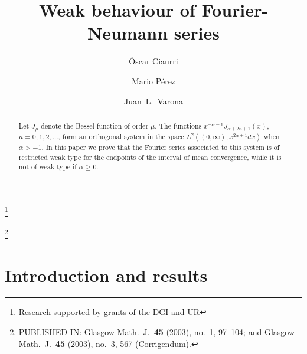 \documentclass{amsart}
\theoremstyle{plain}
\begin{document}
\title{Weak behaviour of Fourier-Neumann series}

\author[\'O. Ciaurri]{\'Oscar Ciaurri}
\address{Departamento de Matem\'aticas y Computaci\'on,
Universidad de La Rioja, Edificio J.~L.~Vives,
Calle Luis de Ulloa s/n, 26004 Logro\~no, Spain}

\author[M. P\'erez]{Mario P\'erez}
\address{Departamento de Matem\'aticas,
Edificio de Matem\'aticas, Universidad de Zaragoza,
50009 Zaragoza, Spain}

\author[J. L. Varona]{Juan~L.~Varona}
\address{Departamento de Matem\'aticas y Computaci\'on,
Universidad de La Rioja, Edificio J.~L.~Vives,
Calle Luis de Ulloa s/n, 26004 Logro\~no, Spain}
\thanks{Research supported by grants of the DGI and UR}



\thanks{PUBLISHED IN: Glasgow Math.\ J.\ \textbf{45} (2003), no.~1, 97--104;
and Glasgow Math.\ J.\ \textbf{45} (2003), no.~3, 567 (Corrigendum).}

\begin{abstract}
Let $J_\mu$ denote the Bessel function of order $\mu$. The functions
$x^{-\alpha-1}J_{\alpha+2n+1}(x)$, $n = 0, 1, 2, \dots$,
form an orthogonal system in the space $L^2((0,\infty),x^{2\alpha+1}dx)$
when $\alpha>-1$. In this paper we prove that the Fourier series associated
to this system is of restricted weak type for the endpoints of
the interval of mean convergence, while it is not of weak type if $\alpha
\geq 0$.
\end{abstract}

\maketitle

\section{Introduction and results}
\end{document}
